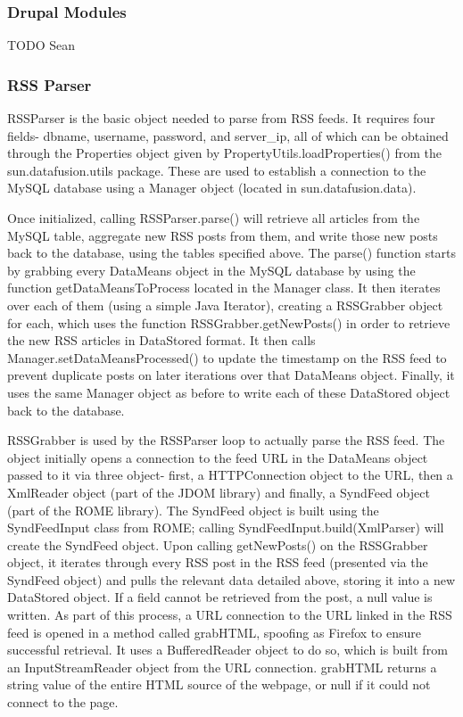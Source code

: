 \documentclass[11pt]{article} %
\begin{document}
\subsubsection{Drupal Modules}

TODO Sean

\subsubsection{RSS Parser}

RSSParser is the basic object needed to parse from RSS feeds. It requires four fields- dbname, username, password, and server\_ip, all of which can be obtained through the Properties object given by PropertyUtils.loadProperties() from the sun.datafusion.utils package. These are used to establish a connection to the MySQL database using a Manager object (located in sun.datafusion.data).

Once initialized, calling RSSParser.parse() will retrieve all articles from the MySQL table, aggregate new RSS posts from them, and write those new posts back to the database, using the tables specified above. The parse() function starts by grabbing every DataMeans object in the MySQL database by using the function getDataMeansToProcess located in the Manager class. It then iterates over each of them (using a simple Java Iterator), creating a RSSGrabber object for each, which uses the function RSSGrabber.getNewPosts() in order to retrieve the new RSS articles in DataStored format. It then calls Manager.setDataMeansProcessed() to update the timestamp on the RSS feed to prevent duplicate posts on later iterations over that DataMeans object. Finally, it uses the same Manager object as before to write each of these DataStored object back to the database.

RSSGrabber is used by the RSSParser loop to actually parse the RSS feed. The object initially opens a connection to the feed URL in the DataMeans object passed to it via three object- first, a HTTPConnection object to the URL, then a XmlReader object (part of the JDOM library) and finally, a SyndFeed object (part of the ROME library). The SyndFeed object is built using the SyndFeedInput class from ROME; calling SyndFeedInput.build(XmlParser) will create the SyndFeed object. Upon calling getNewPosts() on the RSSGrabber object, it iterates through every RSS post in the RSS feed (presented via the SyndFeed object) and pulls the relevant data detailed above, storing it into a new DataStored object. If a field cannot be retrieved from the post, a null value is written. As part of this process, a URL connection to the URL linked in the RSS feed is opened in a method called grabHTML, spoofing as Firefox to ensure successful retrieval. It uses a BufferedReader object to do so, which is built from an InputStreamReader object from the URL connection. grabHTML returns a string value of the entire HTML source of the webpage, or null if it could not connect to the page.
\end{document}
